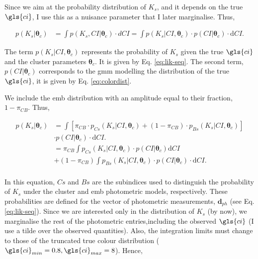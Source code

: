 Since we aim at the probability distribution of $K_s$, and it depends on the true $\gls{ci}$, I use this as a nuisance parameter that I later marginalise. Thus, 

\begin{align}
p(K_s | \boldsymbol{\theta}_c) & = \int p(K_s,CI | \boldsymbol{\theta}_c) \cdot dCI =  \int p(K_s | CI ,\boldsymbol{\theta}_c) \cdot p(CI|\boldsymbol{\theta}_c)\cdot \mathrm{d}CI. \nonumber
\end{align}

The term $p(K_s | CI ,\boldsymbol{\theta}_c)$ represents the probability of $K_s$ given the true $\gls{ci}$ and the cluster parameters $\boldsymbol{\theta}_c$. It is given by Eq. \ref{eq:lik-seq}. The second term, $p(CI|\boldsymbol{\theta}_c)$ corresponds to the \gls{gmm} modelling the distribution of the true $\gls{ci}$, it is given by Eq. \ref{eq:colordist}. 

We include the \gls{emb}  distribution with an amplitude equal to their fraction, $1-\pi_{CB}$. Thus,

\begin{align}
p(K_s | \boldsymbol{\theta}_c) & =  \int \left[\pi_{CB}\cdot p_{Cs}(K_s| CI, \boldsymbol{\theta}_c) + (1-\pi_{CB})\cdot p_{Bs}(K_s| CI, \boldsymbol{\theta}_c)\right]\nonumber \\& \cdot p(CI|\boldsymbol{\theta}_c)\cdot \mathrm{d}CI. \nonumber \\
& =   \pi_{CB} \int p_{Cs}(K_s| CI, \boldsymbol{\theta}_c) \cdot p(CI|\boldsymbol{\theta}_c) \mathrm{d}CI \nonumber \\
&+ (1-\pi_{CB})\int p_{Bs}(K_s| CI, \boldsymbol{\theta}_c) \cdot p(CI|\boldsymbol{\theta}_c)\cdot  \mathrm{d}CI. \nonumber \\
\end{align}

In this equation, $Cs$ and $Bs$ are the subindices used to distinguish the probability of $K_s$ under the cluster and \gls{emb} photometric models, respectively. These probabilities are defined for the vector of photometric measurements, $\boldsymbol{d}_{ph}$ (see Eq. \ref{eq:lik-seq}). Since we are interested only in the distribution of $K_s$ (by now), we marginalise the rest of the photometric entries,including the observed $\gls{ci}$ (I use a tilde over the observed quantities). Also, the integration limits must change to those of the truncated true colour distribution ($\gls{ci}_{min}=0.8, \gls{ci}_{max}=8$). Hence,

